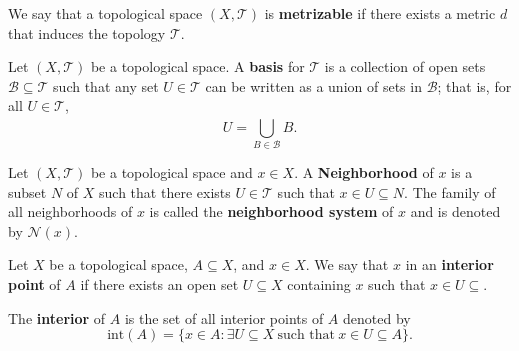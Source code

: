 \documentclass[a4paper]{article}
\begin{document}
\begin{definition}
    We say that a topological space \( (X,\mathcal{T}) \) is \textbf{metrizable} if there exists a metric \( d  \) that induces the topology \( \mathcal{T} \). 
\end{definition}


\begin{definition}
   Let \( (X,\mathcal{T}) \) be a topological space. A \textbf{basis} for \( \mathcal{T} \) is a collection of open sets \( \mathcal{B} \subseteq \mathcal{T} \) such that any set \( U \in \mathcal{T} \) can be written as a union of sets in \( \mathcal{B} \); that is, for all \( U \in \mathcal{T} \), 
   \[  U = \bigcup_{ B \in \mathcal{B} }^{  } B. \]
\end{definition}

\begin{definition}[Neighborhood]
   Let \( (X,\mathcal{T}) \) be a topological space and \( x \in X  \). A \textbf{Neighborhood} of \( x  \) is a subset \( N  \) of \( X  \) such that there exists \( U \in \mathcal{T} \) such that \( x \in U \subseteq N  \). The family of all neighborhoods of \( x  \) is called the \textbf{neighborhood system} of \( x  \) and is denoted by \( \mathcal{N}(x) \).
\end{definition}

\begin{definition}[Interior]
   Let \( X  \) be a topological space, \( A \subseteq X  \), and \( x \in X  \). We say that \( x  \) in an \textbf{interior point} of \( A  \) if there exists an open set \( U \subseteq X   \) containing \( x  \) such that \( x \in U \subseteq  \). 

   The \textbf{interior} of \( A  \) is the set of all interior points of \( A  \) denoted by
   \[  \text{int}(A) = \{ x \in A : \exists U \subseteq X \ \text{such that} \ x \in U \subseteq A \}.   \]
\end{definition}
\end{document}

